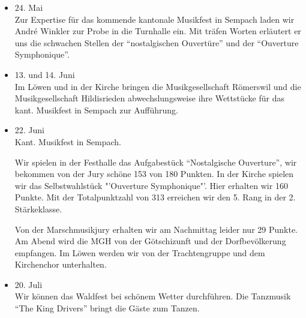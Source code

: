 \begin{multicols}{2}
\begin{itemize}
        \item[]24. Mai\\
        Zur Expertise für das kommende kantonale Musikfest in Sempach laden wir André Winkler zur
        Probe in die Turnhalle ein. Mit träfen Worten erläutert er uns die schwachen Stellen der
        "`nostalgischen Ouvertüre"' und der "`Ouverture Symphonique"'.

        \item[]13. und 14. Juni\\
        Im Löwen und in der Kirche bringen die Musikgesellschaft Römerswil und die Musikgesellschaft Hildisrieden
        abwechslungsweise ihre Wettstücke für das kant. Musikfest in Sempach zur Aufführung.

        \item[]22. Juni\\
        Kant. Musikfest in Sempach.

        Wir spielen in der Festhalle das Aufgabestück "`Nostalgische Ouverture"',
        wir bekommen von der Jury schöne 153 von 180 Punkten. In der Kirche spielen wir das Selbstwahlstück
        "'Ouverture Symphonique"'. Hier erhalten wir 160 Punkte.
        Mit der Totalpunktzahl von 313 erreichen wir den 5. Rang in der 2. Stärkeklasse.

        Von der Marschmusikjury erhalten wir am Nachmittag leider nur 29 Punkte.
        Am Abend wird die MGH von der Götschizunft und der Dorfbevölkerung empfangen.
        Im Löwen werden wir von der Trachtengruppe und dem Kirchenchor unterhalten.

        \item[]20. Juli\\
        Wir können das Waldfest bei schönem Wetter durchführen. Die Tanzmusik "`The King Drivers"'
        bringt die Gäste zum Tanzen.



    \end{itemize}

\end{multicols}
